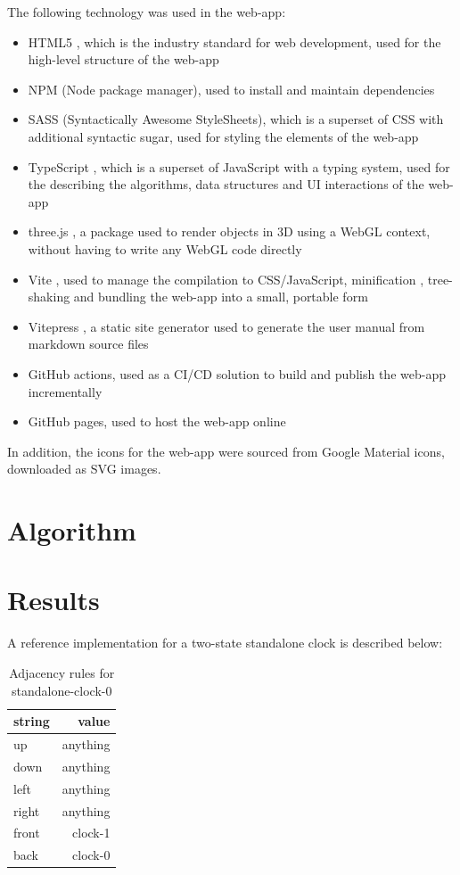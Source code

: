 \documentclass[letterpaper,11pt]{article}
\begin{document}
The following technology was used in the web-app:

\begin{itemize}
	\item HTML5 \cite{HTML5}, which is the industry standard for web development, used for the high-level structure of the web-app
	\item NPM \cite{npm} (Node package manager), used to install and maintain dependencies
	\item SASS \cite{sass} (Syntactically Awesome StyleSheets), which is a superset of CSS with additional syntactic sugar, used for styling the elements of the web-app
	\item TypeScript \cite{typescript}, which is a superset of JavaScript with a typing system, used for the describing the algorithms, data structures and UI interactions of the web-app
	\item three.js \cite{3js}, a package used to render objects in 3D using a WebGL context, without having to write any WebGL code directly
	\item Vite \cite{vite}, used to manage the compilation to CSS/JavaScript, minification \cite{minification}, tree-shaking \cite{tree} and bundling the web-app into a small, portable form
	\item Vitepress \cite{vitepress}, a static site generator \cite{ssg} used to generate the user manual from markdown \cite{markdown} source files
	\item GitHub actions, used as a CI/CD solution to build and publish the web-app incrementally
	\item GitHub pages, used to host the web-app online
\end{itemize}

In addition, the icons for the web-app were sourced from Google Material \cite{google-material} icons, downloaded as SVG images.


\section*{Algorithm}

\section*{Results}

A reference implementation for a two-state standalone clock is described below:

\begin{table}[h!tbp]
	\centering
	\caption{Adjacency rules for standalone-clock-0}
	{\footnotesize %
	\begin{tabular}{|l|r|}
	\hline
	  string & value \\
	\hline
	up & anything \\
	\hline
	down & anything \\
	\hline
	left & anything \\
	\hline
	right & anything \\
	\hline
	front & clock-1 \\
	\hline
	back & clock-0 \\
	\hline
	\end{tabular}
	}
	\end{table}
\end{document}
